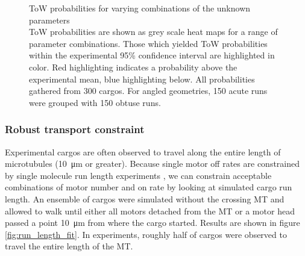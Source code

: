 \begin{figure}
\caption[ToW probabilities for varying combinations of the unknown parameters]{ToW probabilities for varying combinations of the unknown parameters\\
ToW probabilities are shown as grey scale heat maps for a range of parameter combinations. Those which yielded ToW probabilities within the experimental 95\% confidence interval are highlighted in color. Red highlighting indicates a probability above the experimental mean, blue highlighting below. All probabilities gathered from 300 cargos. For angled geometries, 150 acute runs were grouped with 150 obtuse runs.}
\label{fig:ToW_fit}
\end{figure}

\subsubsection*{Robust transport constraint}

Experimental cargos are often observed to travel along the entire length of microtubules (\SI{10}{\micro\meter} or greater). Because single motor off rates are constrained by single molecule run length experiments \cite{Block1990,Milic2014,Li2016}, we can constrain acceptable combinations of motor number and on rate by looking at simulated cargo run length. An ensemble of cargos were simulated without the crossing MT and allowed to walk until either all motors detached from the MT or a motor head passed a point \SI{10}{\micro\meter} from where the cargo started. Results are shown in figure \ref{fig:run_length_fit}. In experiments, roughly half of cargos were observed to travel the entire length of the MT.

